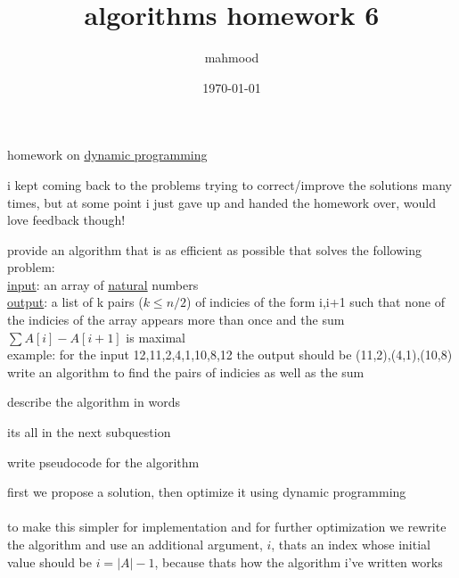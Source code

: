 \documentclass[a4paper,12pt]{article}
\author{mahmood}
\date{\today}
\title{algorithms homework 6}
\begin{document}
\maketitle
homework on \href{20230102173117-dynamic_programming.org}{dynamic programming}\\
\begin{note}
i kept coming back to the problems trying to correct/improve the solutions many times, but at some point i just gave up and handed the homework over, would love feedback though!\\
\end{note}
\begin{question}
provide an algorithm that is as efficient as possible that solves the following problem:\\
\uline{input}: an array of \href{calculus2.org}{natural} numbers\\
\uline{output}: a list of k pairs (\(k \le n/2\)) of indicies of the form i,i+1 such that none of the indicies of the array appears more than once and the sum \(\sum A[i]-A[i+1]\) is maximal\\
example: for the input 12,11,2,4,1,10,8,12 the output should be (11,2),(4,1),(10,8)\\
write an algorithm to find the pairs of indicies as well as the sum\\
\begin{subquestion}
describe the algorithm in words\\
\begin{answer}
its all in the next subquestion\\
\end{answer}
\end{subquestion}
\begin{subquestion}
write pseudocode for the algorithm\\
\begin{answer}
first we propose a solution, then optimize it using dynamic programming\\
\\

to make this simpler for implementation and for further optimization we rewrite the algorithm and use an additional argument, \(i\), thats an index whose initial value should be \(i=|A|-1\), because thats how the algorithm i've written works\\
\\


\end{answer}
\end{subquestion}
\end{question}
\end{document}
